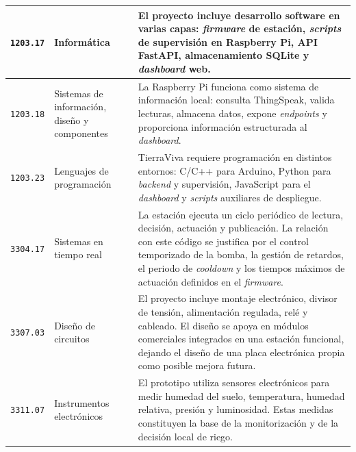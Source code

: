 \begin{longtable}{|
>{\raggedright\arraybackslash}p{}|
>{\raggedright\arraybackslash}p{}|
>{\raggedright\arraybackslash}p{}|}
\texttt{1203.17} & Informática & El proyecto incluye desarrollo software en varias capas: \textit{firmware} de estación, \textit{scripts} de supervisión en Raspberry Pi, API FastAPI, almacenamiento SQLite y \textit{dashboard} web. \\
\hline
\texttt{1203.18} & Sistemas de información, diseño y componentes & La Raspberry Pi funciona como sistema de información local: consulta ThingSpeak, valida lecturas, almacena datos, expone \textit{endpoints} y proporciona información estructurada al \textit{dashboard}. \\
\hline
\texttt{1203.23} & Lenguajes de programación & TierraViva requiere programación en distintos entornos: C/C++ para Arduino, Python para \textit{backend} y supervisión, JavaScript para el \textit{dashboard} y \textit{scripts} auxiliares de despliegue. \\
\hline
\texttt{3304.17} & Sistemas en tiempo real & La estación ejecuta un ciclo periódico de lectura, decisión, actuación y publicación. La relación con este código se justifica por el control temporizado de la bomba, la gestión de retardos, el periodo de \textit{cooldown} y los tiempos máximos de actuación definidos en el \textit{firmware}. \\
\hline
\texttt{3307.03} & Diseño de circuitos & El proyecto incluye montaje electrónico, divisor de tensión, alimentación regulada, relé y cableado. El diseño se apoya en módulos comerciales integrados en una estación funcional, dejando el diseño de una placa electrónica propia como posible mejora futura. \\
\hline
\texttt{3311.07} & Instrumentos electrónicos & El prototipo utiliza sensores electrónicos para medir humedad del suelo, temperatura, humedad relativa, presión y luminosidad. Estas medidas constituyen la base de la monitorización y de la decisión local de riego. \\
\hline

\end{longtable}

\normalsize
\endgroup
